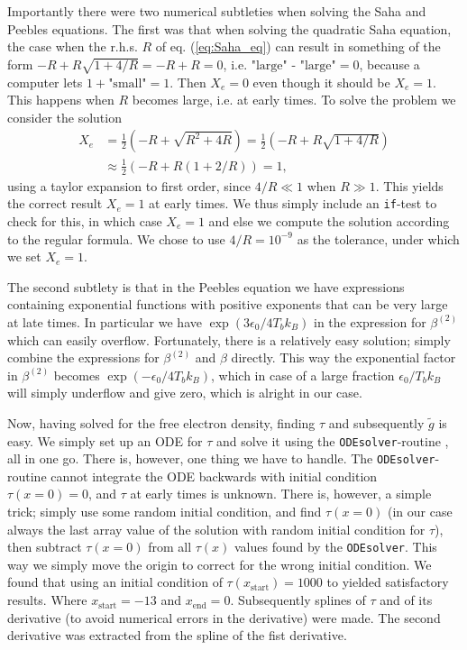 \documentclass[twocolumn]{aastex62}
\begin{document}
Importantly there were two numerical subtleties when solving the Saha and Peebles equations. The first was that when solving the quadratic Saha equation, the case when the r.h.s. $R$ of eq. (\ref{eq:Saha_eq}) can result in something of the form $-R + R\sqrt{1 + 4/R} = -R + R = 0$, i.e. $\text{"large" - "large"} = 0$, because a computer lets $1 + \text{"small"} = 1$. Then $X_e = 0$ even though it should be $X_e = 1$. This happens when $R$ becomes large, i.e. at early times. To solve the problem we consider the solution 
\begin{align}
    X_e &= \frac{1}{2} (-R + \sqrt{R^2 + 4R}) = \frac{1}{2} (-R + R\sqrt{1 + 4/R})\\
        &\approx \frac{1}{2} (-R + R(1 + 2/R)) = 1,
\end{align}
using a taylor expansion to first order, since $4/R \ll 1$ when $R\gg 1$. This yields the correct result $X_e = 1$ at early times. We thus simply include an \texttt{if}-test to check for this, in which case $X_e = 1$ and else we compute the solution according to the regular formula. We chose to use $4/R = 10^{-9}$ as the tolerance, under which we set $X_e = 1$. 

The second subtlety is that in the Peebles equation we have expressions containing exponential functions with positive exponents that can be very large at late times. In particular we have $\exp\left(3\epsilon_0 / 4T_b k_B\right)$ in the expression for $\beta^{(2)}$ which can easily overflow. Fortunately, there is a relatively easy solution; simply combine the expressions for $\beta^{(2)}$ and $\beta$ directly. This way the exponential factor in $\beta^{(2)}$ becomes $\exp\left(-\epsilon_0 / 4T_b k_B\right)$, which in case of a large fraction $\epsilon_0 / T_b k_B$ will simply underflow and give zero, which is alright in our case.

Now, having solved for the free electron density, finding $\tau$ and subsequently $\tilde{g}$ is easy. We simply set up an ODE for $\tau$ and solve it using the \texttt{ODEsolver}-routine \citep[]{winther:2020}, all in one go. There is, however, one thing we have to handle. The \texttt{ODEsolver}-routine cannot integrate the ODE backwards with initial condition $\tau(x = 0) = 0$, and $\tau$ at early times is unknown. There is, however, a simple trick; simply use some random initial condition, and find $\tau(x=0)$ (in our case always the last array value of the solution with random initial condition for $\tau$), then subtract $\tau(x = 0)$ from all $\tau(x)$ values found by the \texttt{ODEsolver}. This way we simply move the origin to correct for the wrong initial condition. We found that using an initial condition of $\tau(x_\text{start}) = 1000$ to yielded satisfactory results. Where $x_\text{start} = -13$ and $x_\text{end} = 0$. Subsequently splines of $\tau$ and of its derivative (to avoid numerical errors in the derivative) were made. The second derivative was extracted from the spline of the fist derivative.
\end{document}
